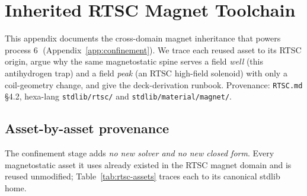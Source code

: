 \section{Inherited RTSC Magnet Toolchain}
\label{app:rtsc}

This appendix documents the cross-domain magnet inheritance that powers
process \textcircled{\scriptsize 6} (Appendix~\ref{app:confinement}). We trace
each reused asset to its RTSC origin, argue why the same magnetostatic spine
serves a field \emph{well} (this antihydrogen trap) and a field \emph{peak}
(an RTSC high-field solenoid) with only a coil-geometry change, and give the
deck-derivation runbook. Provenance: \texttt{RTSC.md} \S4.2, hexa-lang
\texttt{stdlib/rtsc/} and \texttt{stdlib/material/magnet/}.

\subsection{Asset-by-asset provenance}
\label{app:rtsc-assets}

The confinement stage adds \emph{no new solver and no new closed form}. Every
magnetostatic asset it uses already existed in the RTSC magnet domain and is
reused unmodified; Table~\ref{tab:rtsc-assets} traces each to its canonical
stdlib home.


